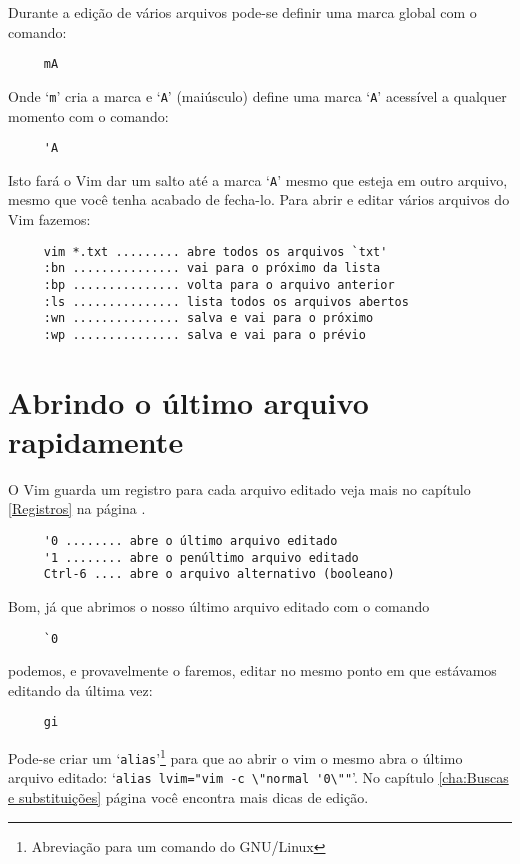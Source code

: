 Durante a edição de vários arquivos pode-se definir uma marca global com o
comando:

\begin{verbatim}
     mA
\end{verbatim}

Onde `{\tt m}' cria a marca e `{\tt A}' (maiúsculo) define uma marca `{\tt A}'
acessível a qualquer momento com o comando:

\begin{verbatim}
     'A
\end{verbatim}

Isto fará o Vim dar um salto até a marca `{\tt A}' mesmo que esteja em outro arquivo,
mesmo que você tenha acabado de fecha-lo. Para abrir e editar vários arquivos
do Vim fazemos:

\begin{verbatim}
     vim *.txt ......... abre todos os arquivos `txt'
     :bn ............... vai para o próximo da lista
     :bp ............... volta para o arquivo anterior
     :ls ............... lista todos os arquivos abertos
     :wn ............... salva e vai para o próximo
     :wp ............... salva e vai para o prévio
\end{verbatim}


\section{Abrindo o último arquivo rapidamente}

O Vim guarda um registro para cada arquivo editado veja
mais no capítulo \ref{Registros} na página \pageref{Registros}.

\begin{verbatim}
     '0 ........ abre o último arquivo editado
     '1 ........ abre o penúltimo arquivo editado
     Ctrl-6 .... abre o arquivo alternativo (booleano)
\end{verbatim}

Bom, já que abrimos o nosso último arquivo editado com o comando

\begin{verbatim}
     `0
\end{verbatim}

podemos, e provavelmente o faremos, editar no mesmo ponto em que estávamos
editando da última vez:

\begin{verbatim}
     gi
\end{verbatim}

{\Large {}} Pode-se criar um `{\tt alias}'\footnote{Abreviação para um
comando do GNU/Linux} para que ao abrir o vim o mesmo abra o último arquivo
editado: `\verb|alias lvim="vim -c \"normal '0\""|'.  No capítulo
\ref{cha:Buscas e substituições} página \pageref{cha:Buscas e substituições}
você encontra mais dicas de edição.


